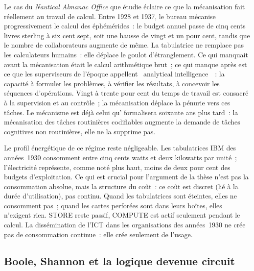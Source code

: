 %
Le cas du \emph{Nautical Almanac Office} que étudie \textcite{daston_calculations_2018} éclaire ce que la mécanisation fait réellement au travail de calcul. Entre 1928 et 1937, le bureau mécanise progressivement le calcul des éphémérides~: le budget annuel passe de cinq cents livres sterling à six cent sept, soit une hausse de vingt et un pour cent, tandis que le nombre de collaborateurs augmente de même. La tabulatrice ne remplace pas les calculateurs humains~: elle déplace le goulot d'étranglement. Ce qui manquait avant la mécanisation était le calcul arithmétique brut~; ce qui manque après est ce que les superviseurs de l'époque appellent \og~analytical intelligence~\fg{}~: la capacité à formuler les problèmes, à vérifier les résultats, à concevoir les séquences d'opérations. Vingt à trente pour cent du temps de travail est consacré à la supervision et au contrôle~; la mécanisation déplace la pénurie vers ces tâches. Le mécanisme est déjà celui qu'\textcite{autor_skills_2003} formalisera soixante ans plus tard~: la mécanisation des tâches routinières codifiables augmente la demande de tâches cognitives non routinières, elle ne la supprime pas.

%
Le profil énergétique de ce régime reste négligeable. Les tabulatrices IBM des années~1930 consomment entre cinq cents watts et deux kilowatts par unité~; l'électricité représente, comme noté plus haut, moins de deux pour cent des budgets d'exploitation. Ce qui est crucial pour l'argument de la thèse n'est pas la consommation absolue, mais la structure du coût~: ce coût est discret (lié à la durée d'utilisation), pas continu. Quand les tabulatrices sont éteintes, elles ne consomment pas~; quand les cartes perforées sont dans leurs boîtes, elles n'exigent rien. STORE reste passif, COMPUTE est actif seulement pendant le calcul. La dissémination de l'ICT dans les organisations des années~1930 ne crée pas de consommation continue~: elle crée seulement de l'usage.


\subsection{Boole, Shannon et la logique devenue circuit}\label{subsec:shannon}

